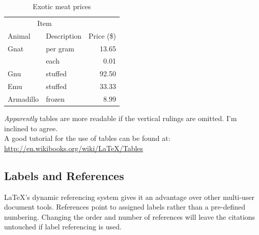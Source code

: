 \documentclass[12pt]{article}
\begin{document}
\begin{table}[h]			%
	\centering
	\begin{tabular}{llr}	%

		\hline		%
		
		\multicolumn{2}{c}{Item} \\		%
								
		\cline{1-2}		%
		
			Animal   	& Description 	& Price (\$) \\	%
		\hline
			Gnat		& per gram		& 13.65      \\
				    	& each      	 	& 0.01       \\
			Gnu		& stuffed     	& 92.50      \\
			Emu		& stuffed		& 33.33      \\
			Armadillo	& frozen		& 8.99       \\
		\hline
	\end{tabular}
	\caption{Exotic meat prices}
	\label{table:meats}
\end{table}
\textit{Apparently} tables are more readable if the vertical rulings are omitted. I'm inclined to agree.\\
A good tutorial for the use of tables can be found at: \url{http://en.wikibooks.org/wiki/LaTeX/Tables}

\subsection{Labels and References}\label{sec:labels_and_refs}
LaTeX's dynamic referencing system gives it an advantage over other multi-user document tools. References point to assigned labels rather than a pre-defined numbering. Changing the order and number of references will leave the citations untouched if label referencing is used.
\end{document}
